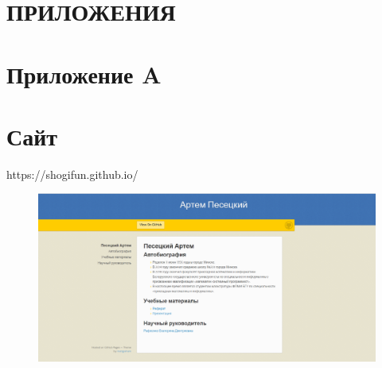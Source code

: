 \newpage
\newpage\section*{ПРИЛОЖЕНИЯ}
\section*{Приложение A}
\section*{Сайт}
https://shogifun.github.io/

\begin{figure}[h]
	\includegraphics[scale=0.5]{images/site.png}
\end{figure}